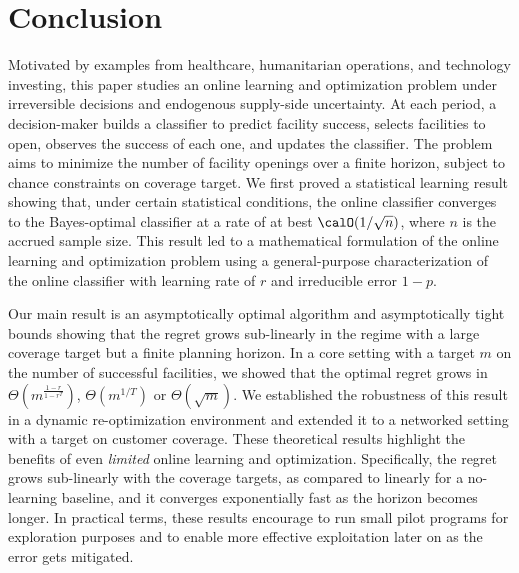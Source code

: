 \documentclass[blindrev]{informs3noheader}
\begin{document}
\section{Conclusion}

Motivated by examples from healthcare, humanitarian operations, and technology investing, this paper studies an online learning and optimization problem under irreversible decisions and endogenous supply-side uncertainty. At each period, a decision-maker builds a classifier to predict facility success, selects facilities to open, observes the success of each one, and updates the classifier. The problem aims to minimize the number of facility openings over a finite horizon, subject to chance constraints on coverage target. We first proved a statistical learning result showing that, under certain statistical conditions, the online classifier converges to the Bayes-optimal classifier at a rate of at best $\calO(1/\sqrt n)$, where $n$ is the accrued sample size. This result led to a mathematical formulation of the online learning and optimization problem using a general-purpose characterization of the online classifier with learning rate of $r$ and irreducible error $1-p$.

Our main result is an asymptotically optimal algorithm and asymptotically tight bounds showing that the regret grows sub-linearly in the regime with a large coverage target but a finite planning horizon. In a core setting with a target $m$ on the number of successful facilities, we showed that the optimal regret grows in $\Theta\left(m^{\frac{1-r}{1-r^T}}\right)$, $\Theta\left(m^{1/T}\right)$ or $\Theta\left(\sqrt m\right)$. We established the robustness of this result in a dynamic re-optimization environment and extended it to a networked setting with a target on customer coverage. These theoretical results highlight the benefits of even \emph{limited} online learning and optimization. Specifically, the regret grows sub-linearly with the coverage targets, as compared to linearly for a no-learning baseline, and it converges exponentially fast as the horizon becomes longer. In practical terms, these results encourage to run small pilot programs for exploration purposes and to enable more effective exploitation later on as the error gets mitigated.
\end{document}
